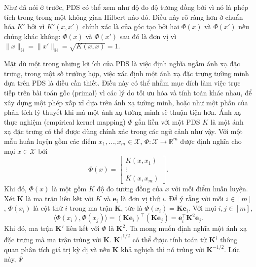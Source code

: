 Như đã nói ở trước,  PDS có thể xem như độ đo độ tương đồng bởi vì
nó là phép tích trong trong một không gian Hilbert nào đó. Điều này rõ ràng hơn
ở  chuẩn hóa $K'$ bởi vì $K'(x, x')$ chính xác là  của
góc tạo bởi hai  $\Phi(x)$ và $\Phi(x')$ nếu chúng khác không:
$\Phi(x)$ và $\Phi(x')$ sau đó là  đơn vị vì $\lVert
x\rVert_\mathbb{H} = \lVert x'\rVert_\mathbb{H} = \sqrt{K(x, x)} = 1$.

Mặt dù một trong những lợi ích của  PDS là việc định nghĩa ngầm
ánh xạ đặc trưng, trong một số trường hợp, việc xác định một ánh xạ đặc trưng
tường minh dựa trên  PDS là điều cần thiết. Điều này có thể nhằm mục
đích làm việc trực tiếp trên bài toán gốc (primal) vì các lý do tối ưu hóa và
tính toán khác nhau, để xây dựng một phép xấp xỉ dựa trên ánh xạ tường minh,
hoặc như một phần của phân tích lý thuyết khi mà một ánh xạ tường minh sẽ thuận
tiện hơn. Ánh xạ  thực nghiệm (empirical kernel mapping) $\Phi$ gắn
liền với một  PDS $K$ là một ánh xạ đặc trưng có thể được dùng chính
xác trong các ngữ cảnh như vậy. Với một mẫu huấn luyện gồm các điểm $x_1,
\dots, x_m \in \mathcal{X}$, $\Phi\colon \mathcal{X}\to\mathbb{R}^m$ được định
nghĩa cho mọi $x\in\mathcal{X}$ bởi \begin{equation}
  \Phi(x) = \begin{bmatrix}
    K(x, x_1) \\
    \vdots \\
    K(x, x_m)
  \end{bmatrix}.
\end{equation}Khi đó, $\Phi(x)$ là một  gồm $K$ độ đo tương đồng của
$x$ với mỗi điểm huấn luyện. Xét $\mathbf{K}$ là ma trận  liên kết
với $K$ và $\mathbf{e}_i$ là  đơn vị thứ $i$. Để ý rằng với mỗi $i
\in [m]$, $\Phi(x_i)$ là cột thứ $i$ trong ma trận $\mathbf{K}$, tức là
$\Phi(x_i) = \mathbf{K}\mathbf{e}_i$.  Với mọi $i, j\in [m]$,
\begin{equation}
  \bigl\langle \Phi(x_i), \Phi(x_j)\bigr\rangle =
  (\mathbf{K}\mathbf{e}_i)^\intercal (\mathbf{K}\mathbf{e}_j) =
  \mathbf{e}_i^\intercal \mathbf{K}^2 \mathbf{e}_j.
\end{equation} Khi đó, ma trận  $\mathbf{K}'$ liên kết với $\Phi$ là
$\mathbf{K}^2$. Ta mong muốn định nghĩa một ánh xạ đặc trưng mà ma trận
 trùng với $\mathbf{K}$. ${\mathbf{K}^{\dag}}^{1/2}$ có thể được
tính toán từ $\mathbf{K}^\dag$ thông quan phân tích giá trị kỳ dị và nếu
$\mathbf{K}$ khả nghịch thì nó trùng với $\mathbf{K}^{-1/2}$. Lúc này, $\Psi$
